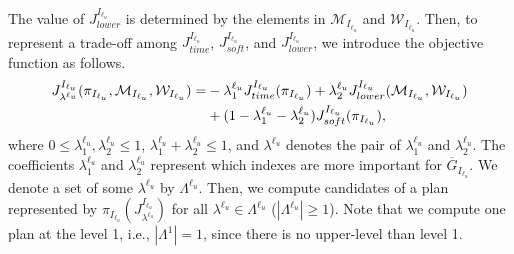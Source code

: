 \documentclass{article}
\newcommand{\Iu}{I_{\ell_u}}
\begin{document}
The value of $J_{lower}^{\Iu}$ is determined by the elements in $\mathcal{M}_{\Iu}$ and $\mathcal{W}_{\Iu}$.
%
Then, to represent a trade-off among $J_{time}^{\Iu}$, $J_{soft}^{\Iu}$, and $J_{lower}^{\Iu}$, we introduce the objective function as follows.
\begin{align}
J_{\lambda^{\ell_u}}^{\Iu}(\pi_{\Iu},\mathcal{M}_{\Iu},\mathcal{W}_{\Iu})
=&-\lambda_1^{\ell_u} J_{time}^{\Iu}(\pi_{\Iu}) + \lambda_2^{\ell_u} J_{lower}^{\Iu}(\mathcal{M}_{\Iu},\mathcal{W}_{\Iu})
\notag\\&+ (1-\lambda_1^{\ell_u}-\lambda_2^{\ell_u})J_{soft}^{\Iu}(\pi_{\Iu}),
\end{align}
where $0\leq\lambda_1^{\ell_u},{\lambda}_2^{\ell_u}\leq1$, $\lambda_1^{\ell_u}+{\lambda}_2^{\ell_u}\leq1$, and ${\lambda}^{\ell_u}$ denotes the pair of $\lambda_1^{\ell_u}$ and $\lambda_2^{\ell_u}$.
The coefficients $\lambda_1^{\ell_u}$ and ${\lambda}_2^{\ell_u}$ represent which indexes are more important for $\overline{G}_{\Iu}$.
%
We denote a set of some ${\lambda}^{\ell_u}$ by $\Lambda^{\ell_u}$.
Then, we compute candidates of a plan represented by $\pi_{\Iu}(J_{\lambda^{\ell_u}}^{\Iu})$ for all $\lambda^{\ell_u}\in\Lambda^{\ell_u}$ ($|\Lambda^{\ell_u}|\geq1$).
Note that we compute one plan at the level 1, i.e., $|\Lambda^1|=1$, since there is no upper-level than level 1.
\end{document}
